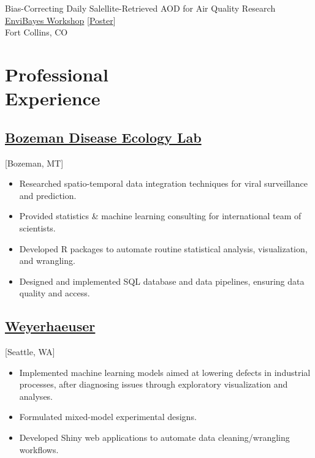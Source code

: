 \documentclass{wm_cv}
\begin{document}
Bias-Correcting Daily Salellite-Retrieved AOD for Air Quality Research \hfill {}\\
\indent \quad \href{https://statistics.colostate.edu/envibayes-workshop/}{EnviBayes Workshop} [\href{https://www.wyattgmadden.com/files/posters/20230918envibayes/envibayes2023.pdf}{Poster}] \\ 
   \indent \quad Fort Collins, CO \\

\section{Professional \\ Experience}
\subsection{\href{http://bzndiseaselab.org/}{Bozeman Disease Ecology Lab}}[Bozeman, MT]
\begin{positions}
\end{positions}

\begin{itemize}
  \item Researched spatio-temporal data integration techniques for viral surveillance and prediction.
  \item Provided statistics \& machine learning consulting for international team of scientists.
  \item Developed R packages to automate routine statistical analysis, visualization, and wrangling.
  \item Designed and implemented SQL database and data pipelines, ensuring data quality and access.
\end{itemize}


\subsection{\href{https://en.wikipedia.org/wiki/Weyerhaeuser}{Weyerhaeuser}}[Seattle, WA]
\begin{positions}
\end{positions}

\begin{itemize}
  \item Implemented machine learning models aimed at lowering defects in industrial processes, after diagnosing issues through exploratory visualization and analyses.
  \item Formulated mixed-model experimental designs.
  \item Developed Shiny web applications to automate data cleaning/wrangling workflows.
\end{itemize} 
\end{document}

